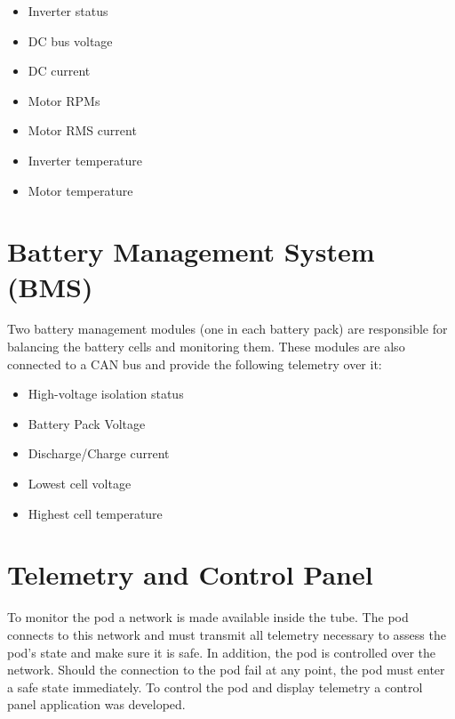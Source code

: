 \begin{itemize}
    \item Inverter status
    \item DC bus voltage
    \item DC current
    \item Motor RPMs
    \item Motor RMS current
    \item Inverter temperature
    \item Motor temperature
\end{itemize}

\section{Battery Management System (BMS)}

Two battery management modules (one in each battery pack) are responsible for balancing the battery cells and monitoring them. These modules are also connected to a CAN bus and provide the following telemetry over it:

\begin{itemize}
    \item High-voltage isolation status
    \item Battery Pack Voltage
    \item Discharge/Charge current
    \item Lowest cell voltage
    \item Highest cell temperature
\end{itemize}

\section{Telemetry and Control Panel}

To monitor the pod a network is made available inside the tube. The pod connects to this network and must transmit all telemetry necessary to assess the pod's state and make sure it is safe. In addition, the pod is controlled over the network. Should the connection to the pod fail at any point, the pod must enter a safe state immediately. To control the pod and display telemetry a control panel application was developed.

